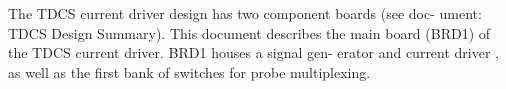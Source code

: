 The TDCS current driver design has two component boards (see doc-
ument: TDCS Design Summary). This document describes the main
board (BRD1) of the TDCS current driver. BRD1 houses a signal gen-
erator and current driver , as well as the first bank of switches for probe
multiplexing.

